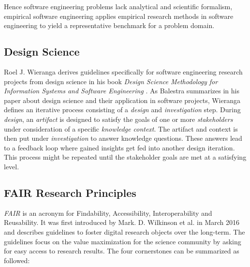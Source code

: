 \documentclass[12pt,a4paper]{article}
\begin{document}
Hence software engineering problems lack analytical and scientific formalism, empirical software engineering applies empirical research methods in software engineering to yield a representative benchmark for a problem domain.

\subsection{Design Science}

Roel J. Wieranga derives guidelines specifically for software engineering research projects from design science in his book \emph{Design Science Methodology for Information Systems and Software Engineering} \cite{wieringa}. As Balestra \cite{balestra:2019:designscience:articactandcontext} summarizes in his paper about design science and their application in software projects, Wieranga \cite{wieringa} defines an iterative process consisting of a \emph{design} and \emph{investigation} step. During \emph{design}, an \emph{artifact} is designed to satisfy the goals of one or more \emph{stakeholders} under consideration of a specific \emph{knowledge context}. The artifact and context is then put under \emph{investigation} to answer knowledge questions. These answers lead to a feedback loop where gained insights get fed into another design iteration. This process might be repeated until the stakeholder goals are met at a satisfying level.

\subsection{FAIR Research Principles}
\emph{FAIR} is an acronym for Findability, Accessibility, Interoperability and Reusability. It was first introduced by Mark. D. Wilkinson et al. in March 2016 \cite{wilkinson:2016} and describes guidelines to foster digital research objects over the long-term. The guidelines focus on the value maximization for the science community by asking for easy access to research results. The four cornerstones can be summarized as followed:
\end{document}
